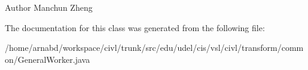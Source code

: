 \begin{DoxyAuthor}{Author}
Manchun Zheng 
\end{DoxyAuthor}


The documentation for this class was generated from the following file\+:\begin{DoxyCompactItemize}
\item 
/home/arnabd/workspace/civl/trunk/src/edu/udel/cis/vsl/civl/transform/common/General\+Worker.\+java\end{DoxyCompactItemize}
